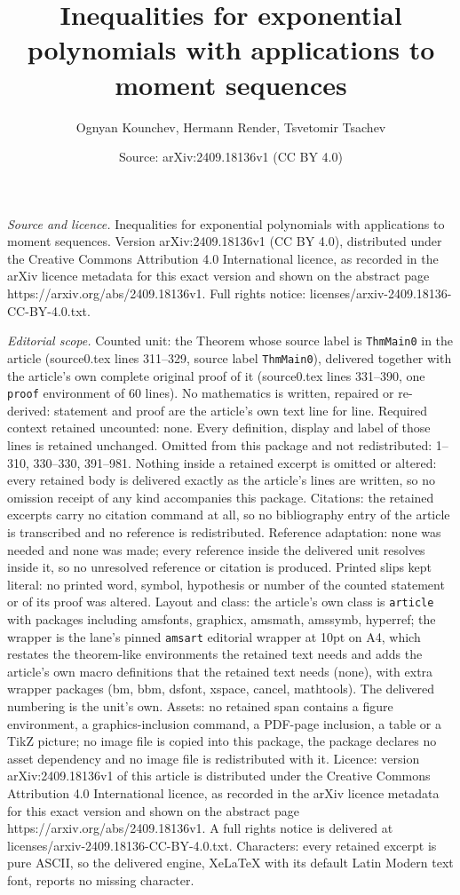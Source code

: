 \documentclass[10pt,a4paper]{amsart}
\title[Inequalities for exponential polynomials with applications t]{Inequalities for exponential polynomials with applications to moment sequences}
\author{Ognyan Kounchev, Hermann Render, Tsvetomir Tsachev}
\date{Source: arXiv:2409.18136v1 (CC BY 4.0)}
\begin{document}
\maketitle

\noindent\emph{Source and licence.} Inequalities for exponential polynomials with applications to moment sequences. Version arXiv:2409.18136v1 (CC BY 4.0), distributed under the Creative Commons Attribution 4.0 International licence, as recorded in the arXiv licence metadata for this exact version and shown on the abstract page https://arxiv.org/abs/2409.18136v1. Full rights notice: licenses/arxiv-2409.18136-CC-BY-4.0.txt.\par\smallskip

\noindent\textit{Editorial scope.} Counted unit: the Theorem whose source label is \texttt{ThmMain0} in the article (source0.tex lines 311--329, source label \texttt{ThmMain0}), delivered together with the article's own complete original proof of it (source0.tex lines 331--390, one \texttt{proof} environment of 60 lines). No mathematics is written, repaired or re-derived: statement and proof are the article's own text line for line. Required context retained uncounted: none. Every definition, display and label of those lines is retained unchanged. Omitted from this package and not redistributed: 1--310, 330--330, 391--981. Nothing inside a retained excerpt is omitted or altered: every retained body is delivered exactly as the article's lines are written, so no omission receipt of any kind accompanies this package. Citations: the retained excerpts carry no citation command at all, so no bibliography entry of the article is transcribed and no reference is redistributed. Reference adaptation: none was needed and none was made; every reference inside the delivered unit resolves inside it, so no unresolved reference or citation is produced. Printed slips kept literal: no printed word, symbol, hypothesis or number of the counted statement or of its proof was altered. Layout and class: the article's own class is \texttt{article} with packages including amsfonts, graphicx, amsmath, amssymb, hyperref; the wrapper is the lane's pinned \texttt{amsart} editorial wrapper at 10pt on A4, which restates the theorem-like environments the retained text needs and adds the article's own macro definitions that the retained text needs (none), with extra wrapper packages (bm, bbm, dsfont, xspace, cancel, mathtools). The delivered numbering is the unit's own. Assets: no retained span contains a figure environment, a graphics-inclusion command, a PDF-page inclusion, a table or a TikZ picture; no image file is copied into this package, the package declares no asset dependency and no image file is redistributed with it. Licence: version arXiv:2409.18136v1 of this article is distributed under the Creative Commons Attribution 4.0 International licence, as recorded in the arXiv licence metadata for this exact version and shown on the abstract page https://arxiv.org/abs/2409.18136v1. A full rights notice is delivered at licenses/arxiv-2409.18136-CC-BY-4.0.txt. Characters: every retained excerpt is pure ASCII, so the delivered engine, XeLaTeX with its default Latin Modern text font, reports no missing character.
\end{document}
